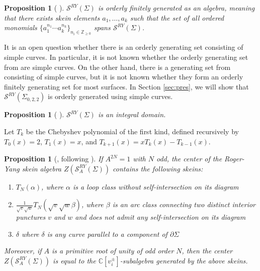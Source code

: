 \documentclass{article}
\newcommand{\del}{\partial}
\newcommand{\Z}{\mathbb{Z}}
\newcommand{\SRY}{\mathcal{S}^{RY}}
\newcommand{\san}{\Sigma_{0,2,2}}
\newtheorem{proposition}[theorem]{Proposition}
\theoremstyle{definition}
\renewcommand{\san}{\Sigma_{0, 2, 2}}
\renewcommand{\SRY}{\ensuremath{ \mathcal S^{RY}}}
\begin{document}
 



\begin{proposition}[ \cite{BKLQTrace} ]
$\SRY(\Sigma)$ is orderly finitely generated as an algebra, meaning that there exists skein elements $a_1,\dots ,a_k $ such that the set of all ordered monomials $\{ a_1^{n_1}\cdots  a_k^{n_k} \}_{n_i \in \Z_{\ge 0}}$ spans $\SRY(\Sigma)$.
\end{proposition} 

It is an open question whether there is an orderly generating set consisting of simple curves.  In particular, it is not known whether the orderly generating set from \cite{BKLQTrace} are simple curves.  On the other hand, there is a generating set from  \cite{BobbPeiferFinGen} consisting of simple curves, but  it is not known whether they form an orderly finitely generating set for most surfaces.  In Section \ref{sec:pres}, we will show that $\mathcal S^{RY}(\san)$ is orderly generated using simple curves.  



\begin{proposition}[ \cite{MoonWongComp, BKLQTrace} ]
$\SRY(\Sigma)$ is an integral domain.
\end{proposition} 


  
Let  $T_k$ be the Chebyshev polynomial of the first kind, defined recursively by $T_0(x) = 2$, $T_1(x) = x$, and $T_{k+1}(x) = x T_{k}(x) - T_{k-1}(x)$. 



\begin{proposition}[\cite{KaruoMoonWongCenter}, following \cite{BonWonSkeinReps1, LeMoreRoots, KaruoPositive}] \label{prop:center}
If $A^{2N} = 1$ with $N$ odd, the center of the Roger-Yang skein algebra $Z(\mathcal S_{A}^{RY}(\Sigma))$ contains the following skeins: 
\begin{enumerate}
\item $T_{N}(\alpha)$, \; where $\alpha$ is a loop class  without self-intersection on its diagram
\item  $\frac{1}{\sqrt{v}\sqrt{w}}T_{N}(\sqrt{v}\sqrt{w}\beta)$, \; where $\beta$ is an arc class connecting two distinct interior punctures $v$ and $w$ and does not admit any self-intersection on its diagram 
\item  $\delta$ where $\delta$ is any curve parallel to a component of $\del \Sigma$
\end{enumerate}

Moreover, if $A$ is a primitive root of unity of odd order $N$, then the center $Z(\mathcal S_{A}^{RY}(\Sigma))$ is equal to the $\mathbb C[v_{i}^{\pm}]$-subalgebra generated by the above skeins. 
\end{proposition}
\end{document}
